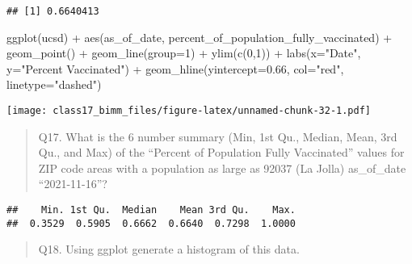 \documentclass[
]{article}
\newenvironment{Shaded}{\begin{snugshade}}{\end{snugshade}}
\newcommand{\AttributeTok}[1]{\textcolor[rgb]{0.77,0.63,0.00}{#1}}
\newcommand{\DecValTok}[1]{\textcolor[rgb]{0.00,0.00,0.81}{#1}}
\newcommand{\FloatTok}[1]{\textcolor[rgb]{0.00,0.00,0.81}{#1}}
\newcommand{\FunctionTok}[1]{\textcolor[rgb]{0.00,0.00,0.00}{#1}}
\newcommand{\NormalTok}[1]{#1}
\newcommand{\SpecialCharTok}[1]{\textcolor[rgb]{0.00,0.00,0.00}{#1}}
\newcommand{\StringTok}[1]{\textcolor[rgb]{0.31,0.60,0.02}{#1}}
\begin{document}
\begin{verbatim}
## [1] 0.6640413
\end{verbatim}

\begin{Shaded}
\begin{Highlighting}[]
\FunctionTok{ggplot}\NormalTok{(ucsd) }\SpecialCharTok{+}
\FunctionTok{aes}\NormalTok{(as\_of\_date,}
\NormalTok{percent\_of\_population\_fully\_vaccinated) }\SpecialCharTok{+}
\FunctionTok{geom\_point}\NormalTok{() }\SpecialCharTok{+}
\FunctionTok{geom\_line}\NormalTok{(}\AttributeTok{group=}\DecValTok{1}\NormalTok{) }\SpecialCharTok{+}
\FunctionTok{ylim}\NormalTok{(}\FunctionTok{c}\NormalTok{(}\DecValTok{0}\NormalTok{,}\DecValTok{1}\NormalTok{)) }\SpecialCharTok{+}
\FunctionTok{labs}\NormalTok{(}\AttributeTok{x=}\StringTok{"Date"}\NormalTok{, }\AttributeTok{y=}\StringTok{"Percent Vaccinated"}\NormalTok{) }\SpecialCharTok{+} \FunctionTok{geom\_hline}\NormalTok{(}\AttributeTok{yintercept=}\FloatTok{0.66}\NormalTok{, }\AttributeTok{col=}\StringTok{"red"}\NormalTok{, }\AttributeTok{linetype=}\StringTok{"dashed"}\NormalTok{)}
\end{Highlighting}
\end{Shaded}

\texttt{[image: class17\_bimm\_files/figure-latex/unnamed-chunk-32-1.pdf]}

\begin{quote}
Q17. What is the 6 number summary (Min, 1st Qu., Median, Mean, 3rd Qu.,
and Max) of the ``Percent of Population Fully Vaccinated'' values for
ZIP code areas with a population as large as 92037 (La Jolla)
as\_of\_date ``2021-11-16''?
\end{quote}

\begin{Shaded}
\end{Shaded}

\begin{verbatim}
##    Min. 1st Qu.  Median    Mean 3rd Qu.    Max. 
##  0.3529  0.5905  0.6662  0.6640  0.7298  1.0000
\end{verbatim}

\begin{quote}
Q18. Using ggplot generate a histogram of this data.
\end{quote}
\end{document}
